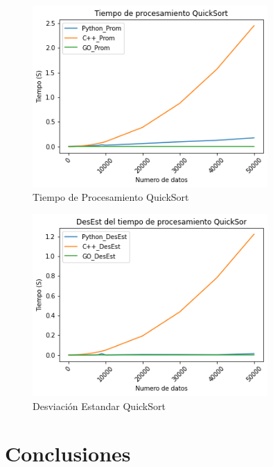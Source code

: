 \documentclass{article}
\begin{document}
\begin{enumerate}
\begin{figure}[H]
\centering
\includegraphics[width=0.8\textwidth]{Imagen/TP_QuickSort.png}
\caption{Tiempo de Procesamiento QuickSort}
\label{fig:QuickSort}
\end{figure}

\begin{figure}[H]
\centering
\includegraphics[width=0.8\textwidth]{Imagen/DE_QuickSort.png}
\caption{Desviación Estandar QuickSort}
\label{fig:QuickSort}
\end{figure}
  
        
        
        
    \end{enumerate}

\section{Conclusiones}
\end{document}
